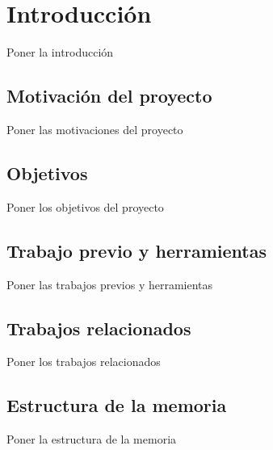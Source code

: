 \chapter{Introducción}
\thispagestyle{empty}



Poner la introducción

\section{Motivación del proyecto}
\thispagestyle{empty}

       \vspace{1cm}

Poner las motivaciones del proyecto

\section{Objetivos}
\thispagestyle{empty}

       \vspace{1cm}

Poner los objetivos del proyecto

\section{Trabajo previo y herramientas}
\thispagestyle{empty}

       \vspace{1cm}

Poner las trabajos previos y herramientas       

\section{Trabajos relacionados}
\thispagestyle{empty}

       \vspace{1cm}

Poner los trabajos relacionados


\section{Estructura de la memoria}
\thispagestyle{empty}
       \vspace{1cm}

Poner la estructura de la memoria


